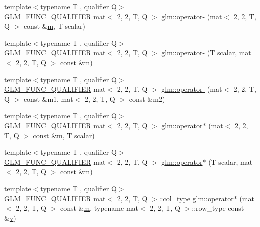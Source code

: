 \begin{DoxyCompactItemize}
{\footnotesize template$<$typename T , qualifier Q$>$ }\\\hyperlink{setup_8hpp_a33fdea6f91c5f834105f7415e2a64407}{G\+L\+M\+\_\+\+F\+U\+N\+C\+\_\+\+Q\+U\+A\+L\+I\+F\+I\+ER} mat$<$ 2, 2, T, Q $>$ \hyperlink{namespaceglm_a1377fda325537bf0f563c7bd829416ff}{glm\+::operator-\/} (mat$<$ 2, 2, T, Q $>$ const \&\hyperlink{_s_d_l__opengl__glext_8h_af593500c283bf1a787a6f947f503a5c2}{m}, T scalar)
\item 
{\footnotesize template$<$typename T , qualifier Q$>$ }\\\hyperlink{setup_8hpp_a33fdea6f91c5f834105f7415e2a64407}{G\+L\+M\+\_\+\+F\+U\+N\+C\+\_\+\+Q\+U\+A\+L\+I\+F\+I\+ER} mat$<$ 2, 2, T, Q $>$ \hyperlink{namespaceglm_ab1508d8f7697189f83fa786e66533ccc}{glm\+::operator-\/} (T scalar, mat$<$ 2, 2, T, Q $>$ const \&\hyperlink{_s_d_l__opengl__glext_8h_af593500c283bf1a787a6f947f503a5c2}{m})
\item 
{\footnotesize template$<$typename T , qualifier Q$>$ }\\\hyperlink{setup_8hpp_a33fdea6f91c5f834105f7415e2a64407}{G\+L\+M\+\_\+\+F\+U\+N\+C\+\_\+\+Q\+U\+A\+L\+I\+F\+I\+ER} mat$<$ 2, 2, T, Q $>$ \hyperlink{namespaceglm_a201b559537ef9c60afcbc3b9907943e2}{glm\+::operator-\/} (mat$<$ 2, 2, T, Q $>$ const \&m1, mat$<$ 2, 2, T, Q $>$ const \&m2)
\item 
{\footnotesize template$<$typename T , qualifier Q$>$ }\\\hyperlink{setup_8hpp_a33fdea6f91c5f834105f7415e2a64407}{G\+L\+M\+\_\+\+F\+U\+N\+C\+\_\+\+Q\+U\+A\+L\+I\+F\+I\+ER} mat$<$ 2, 2, T, Q $>$ \hyperlink{namespaceglm_a10927c695f87f4e9a4c9b6493980b842}{glm\+::operator$\ast$} (mat$<$ 2, 2, T, Q $>$ const \&\hyperlink{_s_d_l__opengl__glext_8h_af593500c283bf1a787a6f947f503a5c2}{m}, T scalar)
\item 
{\footnotesize template$<$typename T , qualifier Q$>$ }\\\hyperlink{setup_8hpp_a33fdea6f91c5f834105f7415e2a64407}{G\+L\+M\+\_\+\+F\+U\+N\+C\+\_\+\+Q\+U\+A\+L\+I\+F\+I\+ER} mat$<$ 2, 2, T, Q $>$ \hyperlink{namespaceglm_aed9324ded8d99d04c11469336712e453}{glm\+::operator$\ast$} (T scalar, mat$<$ 2, 2, T, Q $>$ const \&\hyperlink{_s_d_l__opengl__glext_8h_af593500c283bf1a787a6f947f503a5c2}{m})
\item 
{\footnotesize template$<$typename T , qualifier Q$>$ }\\\hyperlink{setup_8hpp_a33fdea6f91c5f834105f7415e2a64407}{G\+L\+M\+\_\+\+F\+U\+N\+C\+\_\+\+Q\+U\+A\+L\+I\+F\+I\+ER} mat$<$ 2, 2, T, Q $>$\+::col\+\_\+type \hyperlink{namespaceglm_a3cd60e902ab9b6dbef3d0fa73d3277e1}{glm\+::operator$\ast$} (mat$<$ 2, 2, T, Q $>$ const \&\hyperlink{_s_d_l__opengl__glext_8h_af593500c283bf1a787a6f947f503a5c2}{m}, typename mat$<$ 2, 2, T, Q $>$\+::row\+\_\+type const \&\hyperlink{_s_d_l__opengl_8h_a10a82eabcb59d2fcd74acee063775f90}{v})

\end{DoxyCompactItemize}
